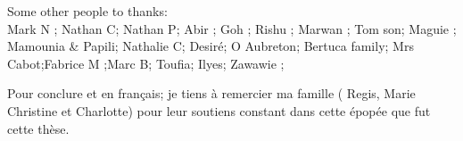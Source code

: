 \documentclass[english]{spimubphdthesis}
\begin{document}
Some other people to thanks:\\ 
  Mark N ; Nathan C; Nathan P; Abir ; Goh ; Rishu ; Marwan ; Tom son; Maguie ; Mamounia \& Papili; Nathalie C; Desiré; O Aubreton; Bertuca family; Mrs Cabot;Fabrice M ;Marc B; Toufia; Ilyes; Zawawie ; 



Pour conclure et en français;  je tiens à remercier  ma famille ( Regis, Marie Christine et Charlotte) pour leur soutiens constant dans cette épopée que fut cette  thèse.  
\tableofcontents

\mainmatter
\end{document}
